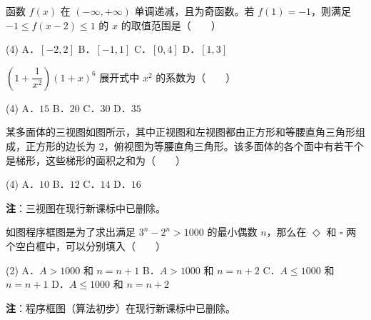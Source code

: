 \begin{question}
函数 $f(x)$ 在 $(-\infty,+\infty)$ 单调递减，且为奇函数。若 $f(1)=-1$，则满足 $-1\le f(x-2)\le1$ 的 $x$ 的取值范围是\mbox{（　　）}

\begin{gkopts}(4)
\task A．$[-2,2]$
\task B．$[-1,1]$
\task C．$[0,4]$
\task D．$[1,3]$
\end{gkopts}

\end{question}
\begin{question}
$\left(1+\dfrac1{x^{2}}\right)(1+x)^{6}$ 展开式中 $x^{2}$ 的系数为\mbox{（　　）}

\begin{gkopts}(4)
\task A．$15$
\task B．$20$
\task C．$30$
\task D．$35$
\end{gkopts}

\Needspace{0.4\textheight}
\end{question}
\begin{question}
某多面体的三视图如图所示，其中正视图和左视图都由正方形和等腰直角三角形组成，正方形的边长为 $2$，俯视图为等腰直角三角形。该多面体的各个面中有若干个是梯形，这些梯形的面积之和为\mbox{（　　）}
\nopagebreak[4]
\begin{center}\end{center}
\nopagebreak[4]
\begin{gkopts}(4)
\task A．$10$
\task B．$12$
\task C．$14$
\task D．$16$
\end{gkopts}

\begin{gktip}
\textbf{注}：三视图在现行新课标中已删除。
\end{gktip}

\Needspace{0.4\textheight}
\end{question}
\begin{question}
如图程序框图是为了求出满足 $3^{n}-2^{n}>1000$ 的最小偶数 $n$，那么在 $\Diamond$ 和 $\square$ 两个空白框中，可以分别填入\mbox{（　　）}
\nopagebreak[4]
\begin{center}\end{center}
\nopagebreak[4]
\begin{gkopts}(2)
\task A．$A>1000$ 和 $n=n+1$
\task B．$A>1000$ 和 $n=n+2$
\task C．$A\le1000$ 和 $n=n+1$
\task D．$A\le1000$ 和 $n=n+2$
\end{gkopts}

\begin{gktip}
\textbf{注}：程序框图（算法初步）在现行新课标中已删除。
\end{gktip}

\end{question}
